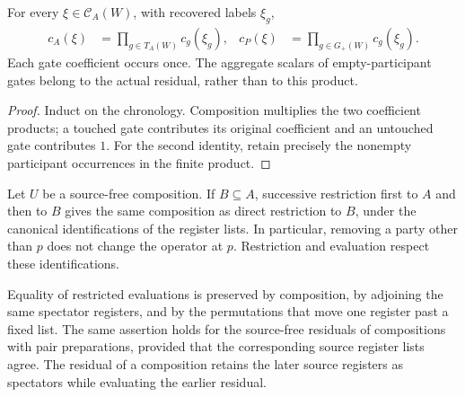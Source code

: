 \begin{theorem}
    \label{thm:peps_chrono_coefficient}
    \leanok
    For every $\xi\in\mathcal C_A(W)$, with recovered labels $\xi_g$,
    \begin{align}
        c_A(\xi) & =\prod_{g\in T_A(W)}c_g(\xi_g), &
        c_P(\xi) & =\prod_{g\in G_+(W)}c_g(\xi_g).
        \label{eq:peps_chrono_coefficient}
    \end{align}
    Each gate coefficient occurs once. The aggregate scalars of empty-participant
    gates belong to the actual residual, rather than to this product.
\end{theorem}

\begin{proof}
    \leanok
    Induct on the chronology. Composition multiplies the two coefficient products;
    a touched gate contributes its original coefficient and an untouched gate
    contributes $1$. For the second identity, retain precisely the nonempty
    participant occurrences in the finite product.
\end{proof}

\begin{theorem}
    \label{thm:peps_chrono_restriction}
    \leanok
    Let $U$ be a source-free composition. If $B\subseteq A$, successive restriction
    first to $A$ and then to $B$ gives the same composition as direct restriction
    to $B$, under the canonical identifications of the register lists. In
    particular, removing a party other than $p$ does not change the operator at
    $p$. Restriction and evaluation respect these identifications.

    Equality of restricted evaluations is preserved by composition, by adjoining
    the same spectator registers, and by the permutations that move one register
    past a fixed list. The same assertion holds for the source-free residuals of
    compositions with pair preparations, provided that the corresponding source
    register lists agree. The residual of a composition retains the later source
    registers as spectators while evaluating the earlier residual.
\end{theorem}


